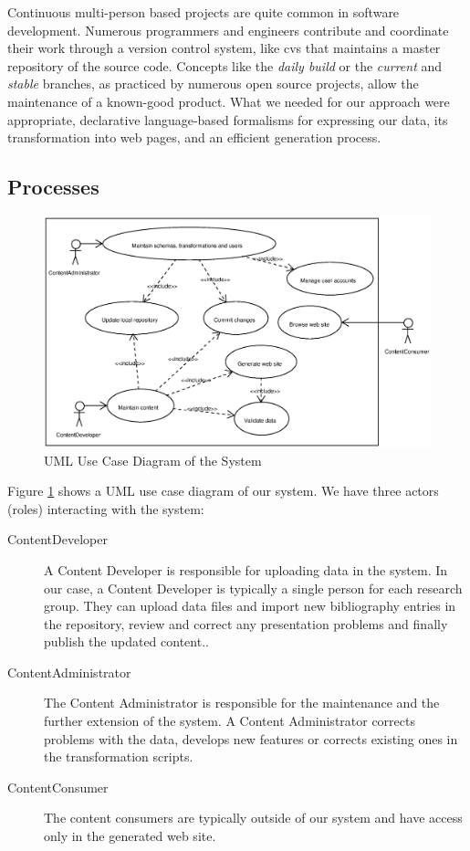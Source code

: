 \documentclass[10pt]{article}
\begin{document}
Continuous multi-person based projects are quite
common in software development.
Numerous programmers and engineers contribute and coordinate their work
through a version control system, like {\sc cvs} \cite{BF01} that
maintains a master repository of the source code.
Concepts like the \textit{daily build} \cite{CS95b} or the
\textit{current} and \textit{stable} branches, as practiced by
numerous open source projects, allow the maintenance
of a known-good product.
What we needed for our approach were appropriate,
declarative language-based formalisms for expressing our data,
its transformation into web pages, and an efficient
generation process.

\subsection{Processes}

\begin{figure}[h!]
\includegraphics[scale=0.5]{use-case-diagram}
\caption{UML Use Case Diagram of the System}
\label{fig:use-case-diagram}
\end{figure}

Figure \ref{fig:use-case-diagram} shows a {\sc UML} \cite{UML} use case diagram of our system. 
We have three actors (roles) interacting with the system:

\begin{description}
\item[ContentDeveloper] A Content Developer is responsible for uploading data in the system. 
In our case, a Content Developer is typically a single person for each research group. They can upload data files and 
import new bibliography entries in the repository, review and correct any presentation problems and finally publish the 
updated content..

\item[ContentAdministrator] The Content Administrator is responsible for the maintenance 
and the further extension of the system. A Content Administrator corrects problems with the data, develops 
new features or corrects existing ones in the transformation scripts.

\item[ContentConsumer] The content consumers are typically outside of our system
and have access only in the generated web site.
\end{description}
\end{document}
